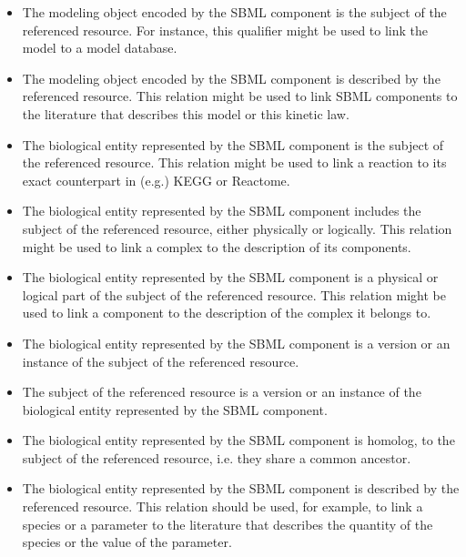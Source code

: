 \begin{itemize}

\item {} The modeling object encoded by the SBML
  component is the subject of the referenced resource. For
  instance, this qualifier might be used to link the model to a
  model database.

\item {} The modeling object
  encoded by the SBML component is described by
  the referenced resource. This relation might be used to link
  SBML components to the literature that describes this model or
  this kinetic law.

\item {} The biological entity represented by the
  SBML component is the subject of the referenced resource. This
  relation might be used to link a reaction to its exact
  counterpart in (e.g.) KEGG or Reactome.

\item {} The biological entity represented by
  the SBML component includes the subject of the referenced
  resource, either physically or logically. This relation might be
  used to link a complex to the description of its components.

\item {} The biological entity represented by
  the SBML component is a physical or logical part of the subject
  of the referenced resource. This relation might be used to link
  a component to the description of the complex it belongs to.

\item {} The biological entity represented
  by the SBML component is a version or an instance of the subject
  of the referenced resource.

\item {} The subject of the referenced
  resource is a version or an instance of the biological entity
  represented by the SBML component.

\item {} The biological entity represented
  by the SBML component is homolog, to the subject of the
  referenced resource, i.e. they share a common ancestor.

\item {} The biological entity
  represented by the SBML component is described by the referenced
  resource. This relation should be used, for example, to link a
  species or a parameter to the literature that describes the
  quantity of the species or the value of the parameter.


\end{itemize}
